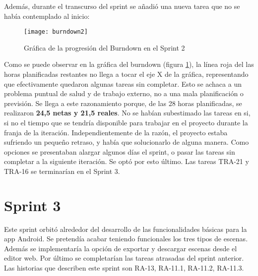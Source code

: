 Además, durante el transcurso del sprint se añadió una nueva tarea que no se había contemplado al inicio:

\begin{table}[H]
\label{TRA-22}
\end{table}

\begin{figure}[h]
    \centering
    \texttt{[image: burndown2]}
    \caption[Burndown Sprint 2]{Gráfica de la progresión del Burndown en el Sprint 2}
	\label{fig:burndown2}
\end{figure}

Como se puede observar en la gráfica del burndown (figura \ref{fig:burndown2}), la línea roja del las horas planificadas restantes no llega a tocar el eje X de la gráfica, representando que efectivamente quedaron algunas tareas sin completar. Esto se achaca a un problema puntual de salud y de trabajo externo, no a una mala planificación o previsión. Se llega a este razonamiento porque, de las 28 horas planificadas, se realizaron \textbf{24,5 netas y 21,5 reales}. No se habían subestimado las tareas en si, si no el tiempo que se tendría disponible para trabajar en el proyecto durante la franja de la iteración. Independientemente de la razón, el proyecto estaba sufriendo un pequeño retraso, y había que solucionarlo de alguna manera. Como opciones se presentaban alargar algunos días el sprint, o pasar las tareas sin completar a la siguiente iteración. Se optó por esto último. Las tareas TRA-21 y TRA-16 se terminarían en el Sprint 3.

\section{Sprint 3}

Este sprint orbitó alrededor del desarrollo de las funcionalidades básicas para la app Android. Se pretendía acabar teniendo funcionales los tres tipos de escenas. Además se implementaría la opción de exportar y descargar escenas desde el editor web. Por último se completarían las tareas atrasadas del sprint anterior. Las historias que describen este sprint son  RA-13, RA-11.1, RA-11.2, RA-11.3.

